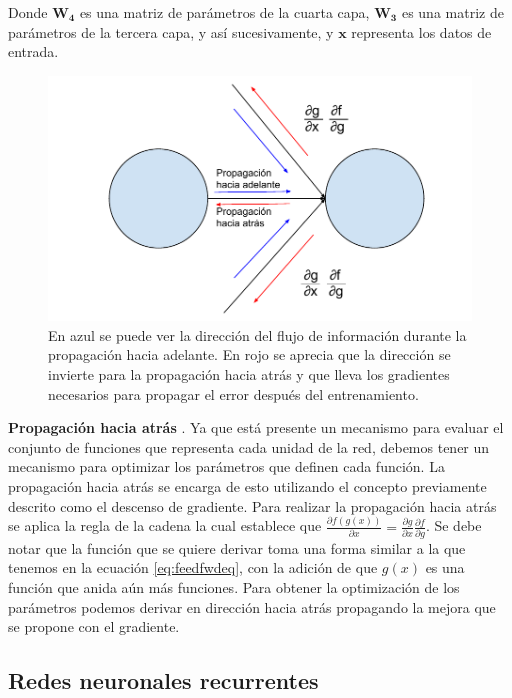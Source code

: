 Donde $\mathbf{W_4}$ es una matriz de parámetros de la cuarta capa, $\mathbf{W_3}$ es una matriz de parámetros de la tercera capa, y así sucesivamente, y $\mathbf{x}$ representa los datos de entrada.

\begin{figure}
\includegraphics[scale=0.8]{Figures/backprop.pdf}
\caption{En azul se puede ver la dirección del flujo de información durante la propagación hacia adelante. En rojo se aprecia que la dirección se invierte para la propagación hacia atrás y que lleva los gradientes necesarios para propagar el error después del entrenamiento.}
\label{fig:backprop}
\end{figure}


\textbf{Propagación hacia atrás} \parencite{rumelhart1986learning}. Ya que está presente un mecanismo para evaluar el conjunto de funciones que representa cada unidad de la red, debemos tener un mecanismo para optimizar los parámetros que definen cada función. La propagación hacia atrás se encarga de esto utilizando el concepto previamente descrito como el descenso de gradiente. Para realizar la propagación hacia atrás se aplica la regla de la cadena la cual establece que $\frac{\partial f(g(x))}{\partial x} = \frac{\partial g}{\partial x} \frac{\partial f}{\partial g}$. Se debe notar que la función que se quiere derivar toma una forma similar a la que tenemos en la ecuación \ref{eq:feedfwdeq}, con la adición de que $g(x)$ es una función que anida aún más funciones. Para obtener la optimización de los parámetros podemos derivar en dirección hacia atrás propagando la mejora que se propone con el gradiente.

\subsection{Redes neuronales recurrentes}

